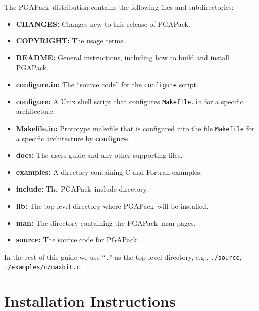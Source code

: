 \documentclass{report}
\newcommand{\pga}{PGAPack}
\begin{document}
The \pga\ distribution contains the following files and
subdirectories:
\begin{itemize}
\item {\bf CHANGES:} Changes new to this release of \pga.
\item {\bf COPYRIGHT:} The usage terms.
\item {\bf README:} General instructions, including how to build and install
\pga.
\item {\bf configure.in:} The ``source code'' for the {\tt configure}
script.
\item {\bf configure:} A Unix shell script that 
configures {\tt Makefile.in} for a specific architecture.
\item {\bf Makefile.in:} Prototype makefile that is configured into the
file {\tt Makefile} for a specific architecture by {\bf configure}.
\item {\bf docs:}  The users guide and any other supporting files.
\item {\bf examples:}  A directory containing C and Fortran examples.
\item {\bf include:} The \pga\ include directory.
\item {\bf lib:} The top-level directory where \pga\ will be installed.
\item {\bf man:} The directory containing the \pga\ man pages.
\item {\bf source:} The source code for \pga.
\end{itemize}
In the rest of this guide we use ``{\tt .}'' as the top-level directory, 
e.g., {\tt ./source}, {\tt ./examples/c/maxbit.c}.


\section{Installation Instructions}\label{sec:install}
\end{document}
